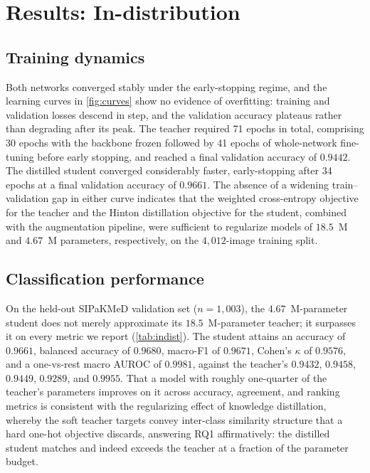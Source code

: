 \section{Results: In-distribution}

\subsection{Training dynamics}

Both networks converged stably under the early-stopping regime, and the learning curves in \ref{fig:curves} show no evidence of overfitting: training and validation losses descend in step, and the validation accuracy plateaus rather than degrading after its peak. The teacher required 71 epochs in total, comprising 30 epochs with the backbone frozen followed by 41 epochs of whole-network fine-tuning before early stopping, and reached a final validation accuracy of $0.9442$. The distilled student converged considerably faster, early-stopping after 34 epochs at a final validation accuracy of $0.9661$. The absence of a widening train--validation gap in either curve indicates that the weighted cross-entropy objective for the teacher and the Hinton distillation objective for the student, combined with the augmentation pipeline, were sufficient to regularize models of $18.5$~M and $4.67$~M parameters, respectively, on the $4{,}012$-image training split.

\subsection{Classification performance}

On the held-out SIPaKMeD validation set ($n=1{,}003$), the $4.67$~M-parameter student does not merely approximate its $18.5$~M-parameter teacher; it surpasses it on every metric we report (\ref{tab:indist}). The student attains an accuracy of $0.9661$, balanced accuracy of $0.9680$, macro-F1 of $0.9671$, Cohen's $\kappa$ of $0.9576$, and a one-vs-rest macro AUROC of $0.9981$, against the teacher's $0.9432$, $0.9458$, $0.9449$, $0.9289$, and $0.9955$. That a model with roughly one-quarter of the teacher's parameters improves on it across accuracy, agreement, and ranking metrics is consistent with the regularizing effect of knowledge distillation, whereby the soft teacher targets convey inter-class similarity structure that a hard one-hot objective discards, answering RQ1 affirmatively: the distilled student matches and indeed exceeds the teacher at a fraction of the parameter budget.

